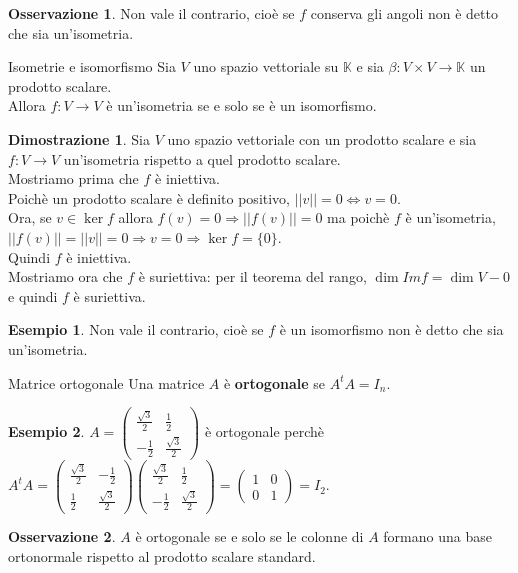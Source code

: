 \documentclass[a4paper]{article}
\theoremstyle{definition}
\newtheorem*{oss}{Osservazione}
\newtheorem*{dimm}{Dimostrazione}
\newtheorem*{es}{Esempio}
\begin{document}
	\begin{oss}
		Non vale il contrario, cioè se $f$ conserva gli angoli non è detto che sia un'isometria.
	\end{oss}

	\begin{teo}{Isometrie e isomorfismo}{}
		Sia $V$ uno spazio vettoriale su $\mathbb{K}$ e sia $\beta: V \times V \to \mathbb{K}$ un prodotto scalare. \\
		Allora $f: V \to V$ è un'isometria se e solo se è un isomorfismo.
	\end{teo}
	\begin{dimm}
		Sia $V$ uno spazio vettoriale con un prodotto scalare e sia $f: V \to V$ un'isometria rispetto a quel prodotto scalare. \\
		Mostriamo prima che $f$ è iniettiva. \\
		Poichè un prodotto scalare è definito positivo, $||v|| = 0 \Leftrightarrow v = 0$. \\
		Ora, se $v \in \ker f$ allora $f(v) = 0 \Rightarrow ||f(v)|| = 0$ ma poichè $f$ è un'isometria, $||f(v)|| = ||v|| = 0 \Rightarrow v = 0 \Rightarrow \ker f = \{0\}$. \\
		Quindi $f$ è iniettiva. \\
		Mostriamo ora che $f$ è suriettiva: per il teorema del rango, $\dim Im f = \dim V - 0$ e quindi $f$ è suriettiva.
	\end{dimm}
	\begin{es}
		Non vale il contrario, cioè se $f$ è un isomorfismo non è detto che sia un'isometria.
	\end{es}

	\begin{deff}{Matrice ortogonale}{}
		Una matrice $A$ è \textbf{ortogonale} se $A^tA = I_n$.
	\end{deff}

	\begin{es}
		$A = \begin{pmatrix}
			\frac{\sqrt{3}}{2} & \frac{1}{2} \\
			-\frac{1}{2} & \frac{\sqrt{3}}{2}
		\end{pmatrix}$ è ortogonale perchè $A^tA = \begin{pmatrix}
			\frac{\sqrt{3}}{2} & -\frac{1}{2} \\
			\frac{1}{2} & \frac{\sqrt{3}}{2}
		\end{pmatrix} \begin{pmatrix}
			\frac{\sqrt{3}}{2} & \frac{1}{2} \\
			-\frac{1}{2} & \frac{\sqrt{3}}{2}
		\end{pmatrix} = \begin{pmatrix}
			1 & 0 \\
			0 & 1
		\end{pmatrix} = I_2$.
	\end{es}
	\begin{oss}
		$A$ è ortogonale se e solo se le colonne di $A$ formano una base ortonormale rispetto al prodotto scalare standard.
	\end{oss}
\end{document}
